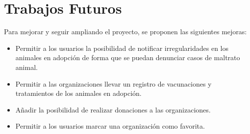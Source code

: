 \section{Trabajos Futuros}\label{sec:trabajos-futuros}

Para mejorar y seguir ampliando el proyecto, se proponen las siguientes mejoras:

\begin{itemize}
    \item Permitir a los usuarios la posibilidad de notificar irregularidades en los animales en adopción de forma que se puedan
    denunciar casos de maltrato animal.
    \item Permitir a las organizaciones llevar un registro de vacunaciones y tratamientos de los animales en adopción.
    \item Añadir la posibilidad de realizar donaciones a las organizaciones.
    \item Permitir a los usuarios marcar una organización como favorita.
\end{itemize}